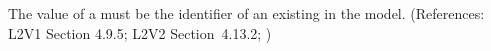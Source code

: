 The value of a \SpeciesReference {}  must be the
identifier of an existing \Species in the model.  (References: L2V1 Section
4.9.5; L2V2 Section~4.13.2; )
